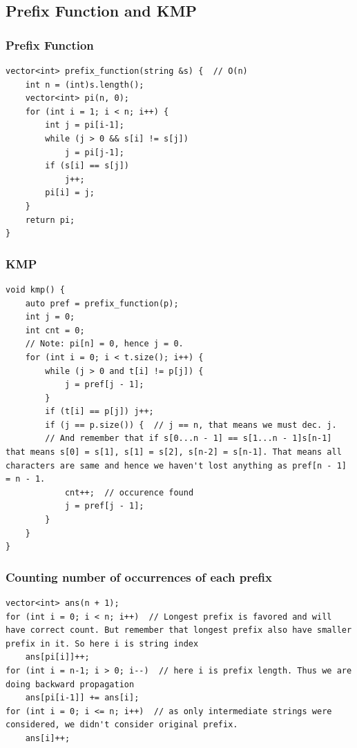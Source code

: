 \documentclass[8pt, a4paper, oneside, twocolumn]{extarticle}
\begin{document}
\subsection{Prefix Function and KMP}
\subsubsection{Prefix Function}
\begin{verbatim}
vector<int> prefix_function(string &s) {  // O(n)
    int n = (int)s.length();
    vector<int> pi(n, 0);
    for (int i = 1; i < n; i++) {
        int j = pi[i-1];
        while (j > 0 && s[i] != s[j])
            j = pi[j-1];
        if (s[i] == s[j])
            j++;
        pi[i] = j;
    }
    return pi;
}
\end{verbatim}
\subsubsection{KMP}
\begin{verbatim}
void kmp() {
    auto pref = prefix_function(p);
    int j = 0;
    int cnt = 0;
	// Note: pi[n] = 0, hence j = 0.
    for (int i = 0; i < t.size(); i++) {
        while (j > 0 and t[i] != p[j]) {
            j = pref[j - 1];
        }
        if (t[i] == p[j]) j++;
        if (j == p.size()) {  // j == n, that means we must dec. j. 
		// And remember that if s[0...n - 1] == s[1...n - 1]s[n-1] that means s[0] = s[1], s[1] = s[2], s[n-2] = s[n-1]. That means all characters are same and hence we haven't lost anything as pref[n - 1] = n - 1.
            cnt++;  // occurence found
            j = pref[j - 1];
        }
    }
}
\end{verbatim}
\subsubsection{Counting number of occurrences of each prefix}
\begin{verbatim}
vector<int> ans(n + 1);
for (int i = 0; i < n; i++)  // Longest prefix is favored and will have correct count. But remember that longest prefix also have smaller prefix in it. So here i is string index
    ans[pi[i]]++;
for (int i = n-1; i > 0; i--)  // here i is prefix length. Thus we are doing backward propagation
    ans[pi[i-1]] += ans[i];
for (int i = 0; i <= n; i++)  // as only intermediate strings were considered, we didn't consider original prefix.
    ans[i]++;
\end{verbatim}
\end{document}
